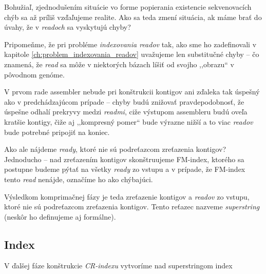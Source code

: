 Bohužiaľ, zjednodušením situácie vo forme popierania existencie sekvenovacích chýb sa až príliš vzďaľujeme realite. Ako sa teda zmení situácia, ak máme brať do úvahy, že v \emph{readoch} sa vyskytujú chyby?

Pripomeňme, že pri probléme \emph{indexovania readov} tak, ako sme ho zadefinovali v kapitole \ref{ch:problem_indexovania_readov} uvažujeme len substitučné chyby -- čo znamená, že \emph{read} sa môže v niektorých bázach líšiť od svojho ,,obrazu`` v pôvodnom genóme.

V prvom rade assembler nebude pri konštrukcii kontigov ani zďaleka tak úspešný ako v predchádzajúcom prípade -- chyby budú znižovať pravdepodobnosť, že úspešne odhalí prekryvy medzi \emph{readmi}, ciže výstupom assembleru budú oveľa kratšie kontigy, čiže aj ,,kompresný pomer`` bude výrazne nižší a to viac \emph{readov} bude potrebné pripojiť na koniec. 

Ako ale nájdeme \emph{ready}, ktoré nie sú podreťazcom zreťazenia kontigov? Jednoducho -- nad zreťazením kontigov skonštruujeme FM-index, ktorého sa postupne budeme pýtať na všetky \emph{ready} zo vstupu a v prípade, že FM-index tento \emph{read} nenájde, označíme ho ako chýbajúci.

Výsledkom komprimačnej fázy je teda zreťazenie kontigov a \emph{readov} zo vstupu, ktoré nie sú podreťazcom zreťazenia kontigov. Tento reťazec nazveme \emph{superstring} (neskôr ho definujeme aj formálne).

\subsection{Index}
V ďalšej fáze konštrukcie \emph{CR-indexu} vytvoríme nad superstringom index


